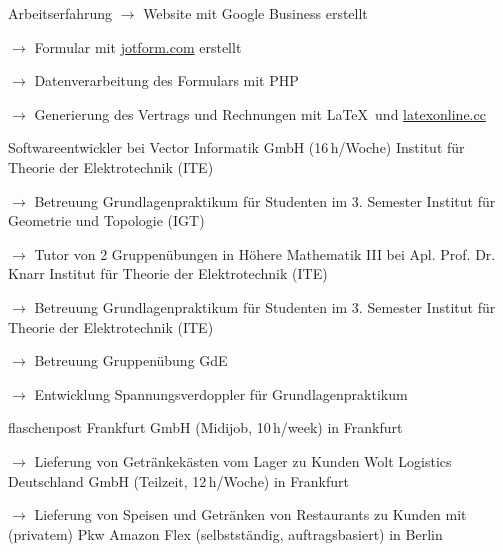 \begin{rubric}{\textcolor{black!20!blue!100}{Arbeitserfahrung}}
			\setlength{\hangindent}{\widthof{$\rightarrow$ }}
			$\rightarrow$ Website mit Google Business erstellt

			$\rightarrow$ Formular mit \href{https://www.jotform.com/}{jotform.com} erstellt

			$\rightarrow$ Datenverarbeitung des Formulars mit PHP

			$\rightarrow$ Generierung des Vertrags und Rechnungen mit \LaTeX\ und \href{https://latexonline.cc/}{latexonline.cc}
			
		\entry*[05/2016 --- 10/2017]
			Softwareentwickler bei Vector Informatik GmbH (16\,h/Woche)
		\entry*[10/2015 --- 03/2016]
			Institut für Theorie der Elektrotechnik (ITE)
				
			\setlength{\hangindent}{\widthof{$\rightarrow$ }}
			$\rightarrow$ Betreuung Grundlagenpraktikum für Studenten im 3. Semester
		\entry*
			Institut für Geometrie und Topologie (IGT)
			
			\setlength{\hangindent}{\widthof{$\rightarrow$ }}
			$\rightarrow$ Tutor von 2 Gruppenübungen in Höhere Mathematik III bei Apl. Prof. Dr. Knarr
		\entry*[10/2014 --- 03/2015]
			Institut für Theorie der Elektrotechnik (ITE)
			
			\setlength{\hangindent}{\widthof{$\rightarrow$ }}
			$\rightarrow$ Betreuung Grundlagenpraktikum für Studenten im 3. Semester
		\entry*[10/2013 --- 03/2014]
			Institut für Theorie der Elektrotechnik (ITE)
			
			\setlength{\hangindent}{\widthof{$\rightarrow$ }}
			$\rightarrow$ Betreuung Gruppenübung GdE
			
			$\rightarrow$ Entwicklung Spannungsverdoppler für Grundlagenpraktikum
	
		\entry*[23/03/2024 --- 26/04/2024]
			flaschenpost Frankfurt GmbH (Midijob, 10\,h/week) in Frankfurt
			
			\setlength{\hangindent}{\widthof{$\rightarrow$ }}
			$\rightarrow$ Lieferung von Getränkekästen vom Lager zu Kunden
		\entry*[06/03/2024 --- 30/04/2024]
			Wolt Logistics Deutschland GmbH (Teilzeit, 12\,h/Woche) in Frankfurt
			
			\setlength{\hangindent}{\widthof{$\rightarrow$ }}
			$\rightarrow$ Lieferung von Speisen und Getränken von Restaurants zu Kunden mit (privatem) Pkw
		\entry*[09/11/2020 --- 06/2022]
			Amazon Flex (selbstständig, auftragsbasiert) in Berlin
			

\end{rubric}
